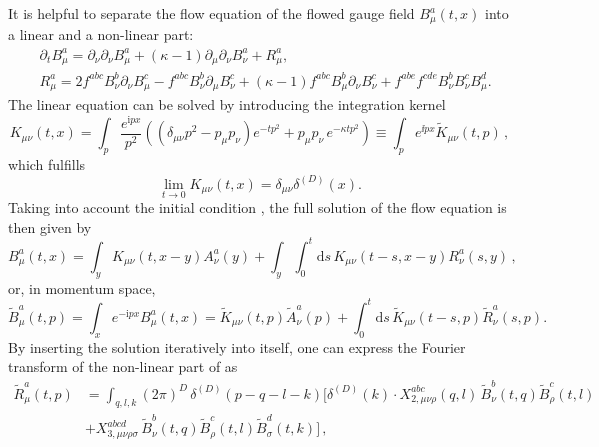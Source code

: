It is helpful to separate the flow equation  of the flowed gauge
field $B_\mu^a(t,x)$ into a linear and a non-linear part:
\begin{equation}
  \begin{split}
  &\partial_t B_\mu^a = \partial_\nu \partial_\nu B_\mu^a + (\kappa - 1)
  \partial_\mu \partial_\nu B_\nu^a + R_\mu^a, \\ &R_\mu^a = 2 f^{abc}
  B_\nu^b \partial_\nu B_\mu^c - f^{abc} B_\nu^b \partial_\mu B_\nu^c +
  (\kappa - 1) f^{abc} B_\mu^b \partial_\nu B_\nu^c + f^{abe} f^{cde}
  B_\nu^b B_\nu^c B_\mu^d.
  \label{eq:flowsep}
  \end{split}
\end{equation}
The linear equation can be solved by introducing the integration kernel
\begin{equation}
  K_{\mu \nu} (t,x) = \int_p \frac{e^{\mathrm{i}px}}{p^2} \left( \left(
  \delta_{\mu \nu} p^2 - p_\mu p_\nu \right) e^{-tp^2} + p_\mu p_\nu \,
  e^{-\kappa tp^2} \right) \equiv \int_p e^{\ii px}\widetilde K_{\mu\nu}(t,p)\,,
  \label{eq:kmunu}
\end{equation}
which fulfills
\begin{equation}
  \lim_{t \to 0} K_{\mu\nu}(t,x) = \delta_{\mu\nu} \delta^{(D)}(x).
\end{equation}
Taking into account the initial condition , the full
solution of the flow equation is then given by
\begin{equation}
  B_\mu^a (t,x) = \int_y K_{\mu \nu}(t,x-y) A_{\nu}^a(y)+ \int_y
  \int_0^t \mathrm{d}s \, K_{\mu \nu}(t-s,x-y) R_\nu^a(s,y)\,,
\end{equation}
or, in momentum space,
\begin{equation}
  \widetilde{B}_\mu^a(t,p)= \int_x e^{-\mathrm{i}px} B_\mu^a(t,x)=
  \widetilde{K}_{\mu \nu}(t,p) \widetilde{A}_\nu^a(p)+ \int_0^t
  \mathrm{d}s \, \widetilde{K}_{\mu \nu}(t-s,p)
  \widetilde{R}_\nu^a(s,p).
  \label{eq:gluon_solution_momentum}
\end{equation}
By inserting the solution iteratively into itself, one can express the
Fourier transform of the non-linear part of  as
\begin{equation}
  \begin{split}
  \widetilde{R}_\mu^a(t,p) &=
  \int_{q,l,k} (2 \pi)^D \, \delta^{(D)}(p-q-l-k)\bigg[
   \delta^{(D)}(k)\cdot X_{2,\mu\nu\rho}^{abc}(q,l)\, \widetilde{B}_{\nu}^{b}(t,q)
      \widetilde{B}_{\rho}^{c}(t,l)\\&
  +
   X_{3,\mu\nu\rho\sigma}^{abcd}\, \widetilde{B}_{\nu}^{b}(t,q)
      \widetilde{B}_{\rho}^{c}(t,l)
      \widetilde{B}_{\sigma}^{d}(t,k)\bigg]\,,
  \end{split}
\end{equation}
